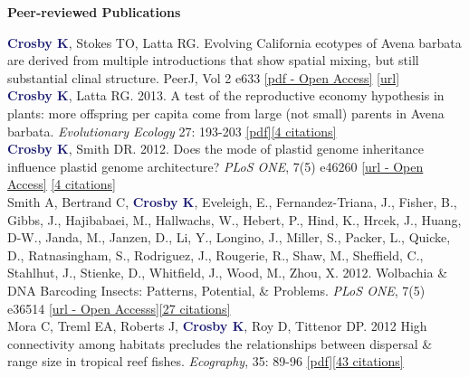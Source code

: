 \documentclass[a4paper,12pt,final]{memoir}
\newcommand{\Sep}{\vspace{1.5em}}
\newcommand{\SmallSep}{\vspace{0.5em}}
\newenvironment{Contact Information}
	{\ignorespaces\textbf{\color{MidnightBlue} Contact Information}}
	{\Sep\ignorespacesafterend}
\newcommand{\CVSection}[1]
	{\Large\textbf{#1}\par
	\SmallSep\normalsize\normalfont}
\begin{document}
\Sep


\CVSection{Peer-reviewed Publications}
\textcolor{MidnightBlue}{\textbf{{Crosby K}}}, Stokes TO, Latta RG. Evolving California ecotypes of Avena barbata are derived from multiple introductions that show spatial mixing, but still substantial clinal structure. PeerJ, Vol 2 e633 \href{https://peerj.com/articles/633.pdf}{[pdf - Open Access]} \href{http://dx.doi.org/10.7717/peerj.633}{[url]}\\

\textcolor{MidnightBlue}{\textbf{{Crosby K}}}, Latta RG. 2013. A test of the reproductive economy hypothesis in plants: more offspring per capita come from large (not small) parents in Avena barbata. \textit{Evolutionary Ecology} 27: 193-203 \href{https://www.researchgate.net/profile/Kate_Crosby/publication/257561503_A_test_of_the_reproductive_economy_hypothesis_in_plants_more_offspring_per_capita_come_from_large_\%28not_small\%29_parents_in_Avena_barbata/links/549893d20cf2519f5a1de721.pdf?origin=publication_detail}{[pdf]}\href{http://scholar.google.ca/scholar?oi=bibs&hl=en&cites=3740505222331803820&as_sdt=5}{[4 citations]}\\

\textcolor{MidnightBlue}{\textbf{{Crosby K}}}, Smith DR. 2012. Does the mode of plastid genome inheritance influence plastid genome architecture?  \textit{PLoS ONE}, 7(5) e46260 \href{http://www.plosone.org/article/info\%3Adoi\%2F10.1371\%2Fjournal.pone.0046260}{[url - Open Access]} \href{http://scholar.google.ca/scholar?oi=bibs&hl=en&cites=8775816063343348897&as_sdt=5}{[4 citations]}\\

Smith A, Bertrand C, \textcolor{MidnightBlue}{\textbf{{Crosby K}}},  Eveleigh, E., Fernandez-Triana, J., Fisher, B., Gibbs, J., Hajibabaei, M., Hallwachs, W., Hebert, P., Hind, K., Hrcek, J., Huang, D-W., Janda, M., Janzen, D., Li, Y., Longino, J., Miller, S., Packer, L., Quicke, D., Ratnasingham, S., Rodriguez, J., Rougerie, R., Shaw, M., Sheffield, C., Stahlhut, J., Stienke, D., Whitfield, J., Wood, M., Zhou, X.  2012. Wolbachia \& DNA Barcoding Insects: Patterns, Potential, \& Problems. \textit{PLoS ONE}, 7(5) e36514 \href{http://www.plosone.org/article/info\%3Adoi\%2F10.1371\%2Fjournal.pone.0036514#pone-0036514-g003}{[url - Open Accesss]}\href{http://scholar.google.ca/scholar?oi=bibs&hl=en&cites=16551803805181280857&as_sdt=5}{[27 citations]}
\\

Mora C, Treml EA, Roberts J, \textcolor{MidnightBlue}{\textbf{{Crosby K}}}, Roy D, Tittenor DP. 2012 High connectivity among habitats precludes the relationships between dispersal \& range size in tropical reef fishes. \textit{Ecography}, 35: 89-96 \href{http://www.researchgate.net/publication/227837454_High_connectivity_among_habitats_precludes_the_relationship_between_dispersal_and_range_size_in_tropical_reef_fishes/file/9c960528513ddcdf0e.pdf}{[pdf]}\href{http://scholar.google.com/scholar?oi=bibs&hl=en&cites=14910466386364676679&as_sdt=5}{[43 citations]}\\
\end{document}
